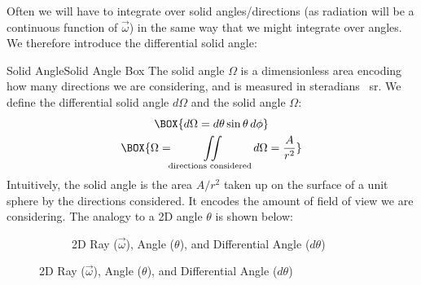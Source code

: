 Often we will have to integrate over solid angles/directions (as radiation will be a continuous function of $\vec{\omega}$) in the same way that we might integrate over angles. We therefore introduce the differential solid angle:

\begin{fact}{Solid Angle}{Solid Angle Box}\label{Solid Angle Box}
    The solid angle $\Omega$ is a dimensionless area encoding how many directions we are considering, and is measured in steradians \qty{}{\steradian}. We define the differential solid angle $d\Omega$ and the solid angle $\Omega$:
    \begin{gather}
        \BOX{d\Omega=d\theta \sin\theta \,d\phi}\\
        \BOX{\Omega = \iint\displaylimits_\text{directions considered} d\Omega=\frac{A}{r^2}}
    \end{gather}
    Intuitively, the solid angle is the area $A/r^2$ taken up on the surface of a unit sphere by the directions considered. It encodes the amount of field of view we are considering. The analogy to a 2D angle $\theta$ is shown below:
    \begin{figure}[H]
        \centering
        \begin{subfigure}{0.4\linewidth}
            \centering
            \caption{2D Ray ($\vec{\omega}$), Angle ($\theta$), and Differential Angle ($d\theta$)}

\end{subfigure}
\end{figure}
\end{fact}
